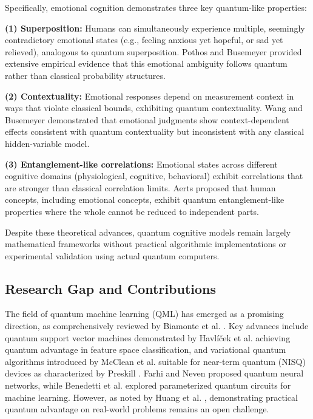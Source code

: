 \documentclass[11pt,letterpaper]{article}
\begin{document}
Specifically, emotional cognition demonstrates three key quantum-like properties:

\textbf{(1) Superposition:} Humans can simultaneously experience multiple, seemingly contradictory emotional states (e.g., feeling anxious yet hopeful, or sad yet relieved), analogous to quantum superposition. Pothos and Busemeyer \cite{pothos2013can} provided extensive empirical evidence that this emotional ambiguity follows quantum rather than classical probability structures.

\textbf{(2) Contextuality:} Emotional responses depend on measurement context in ways that violate classical bounds, exhibiting quantum contextuality. Wang and Busemeyer \cite{wang2015potential} demonstrated that emotional judgments show context-dependent effects consistent with quantum contextuality but inconsistent with any classical hidden-variable model.

\textbf{(3) Entanglement-like correlations:} Emotional states across different cognitive domains (physiological, cognitive, behavioral) exhibit correlations that are stronger than classical correlation limits. Aerts \cite{aerts2009quantum} proposed that human concepts, including emotional concepts, exhibit quantum entanglement-like properties where the whole cannot be reduced to independent parts.

Despite these theoretical advances, quantum cognitive models remain largely mathematical frameworks without practical algorithmic implementations or experimental validation using actual quantum computers.

\subsection{Research Gap and Contributions}

The field of quantum machine learning (QML) has emerged as a promising direction, as comprehensively reviewed by Biamonte et al. \cite{biamonte2017quantum}. Key advances include quantum support vector machines demonstrated by Havlíček et al. \cite{havlicek2019supervised} achieving quantum advantage in feature space classification, and variational quantum algorithms introduced by McClean et al. \cite{mcclean2016theory} suitable for near-term quantum (NISQ) devices as characterized by Preskill \cite{preskill2018quantum}. Farhi and Neven \cite{farhi2018classification} proposed quantum neural networks, while Benedetti et al. \cite{benedetti2019parameterized} explored parameterized quantum circuits for machine learning. However, as noted by Huang et al. \cite{huang2021power}, demonstrating practical quantum advantage on real-world problems remains an open challenge.
\end{document}

